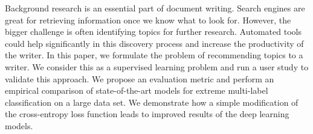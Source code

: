 Background research is an essential part of document writing. Search engines are great for retrieving information once we know what to look for. However, the bigger challenge is often identifying topics for further research. Automated tools could help significantly in this discovery process and increase the productivity of the writer. In this paper, we formulate the problem of recommending topics to a writer. We consider this as a supervised learning problem and run a user study to validate this approach. We propose an evaluation metric and perform an empirical comparison of state-of-the-art models for extreme multi-label classification on a large data set. We demonstrate how a simple modification of the cross-entropy loss function leads to improved results of the deep learning models.
